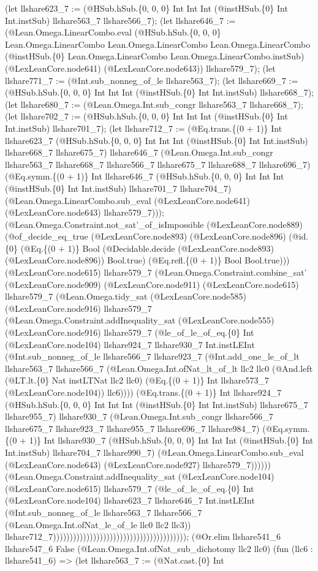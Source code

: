 \documentclass[11pt]{article}
\begin{document}
(let llshare623\_7 := (@HSub.hSub.\{0, 0, 0\} Int Int Int (@instHSub.\{0\} Int Int.instSub) llshare563\_7 llshare566\_7); (let llshare646\_7 := (@Lean.Omega.LinearCombo.eval (@HSub.hSub.\{0, 0, 0\} Lean.Omega.LinearCombo Lean.Omega.LinearCombo Lean.Omega.LinearCombo (@instHSub.\{0\} Lean.Omega.LinearCombo Lean.Omega.LinearCombo.instSub) (@LexLeanCore.node641) (@LexLeanCore.node643)) llshare579\_7); (let llshare771\_7 := (@Int.sub\_nonneg\_of\_le llshare563\_7); (let llshare669\_7 := (@HSub.hSub.\{0, 0, 0\} Int Int Int (@instHSub.\{0\} Int Int.instSub) llshare668\_7); (let llshare680\_7 := (@Lean.Omega.Int.sub\_congr llshare563\_7 llshare668\_7); (let llshare702\_7 := (@HSub.hSub.\{0, 0, 0\} Int Int Int (@instHSub.\{0\} Int Int.instSub) llshare701\_7); (let llshare712\_7 := (@Eq.trans.\{(0 + 1)\} Int llshare623\_7 (@HSub.hSub.\{0, 0, 0\} Int Int Int (@instHSub.\{0\} Int Int.instSub) llshare668\_7 llshare675\_7) llshare646\_7 (@Lean.Omega.Int.sub\_congr llshare563\_7 llshare668\_7 llshare566\_7 llshare675\_7 llshare688\_7 llshare696\_7) (@Eq.symm.\{(0 + 1)\} Int llshare646\_7 (@HSub.hSub.\{0, 0, 0\} Int Int Int (@instHSub.\{0\} Int Int.instSub) llshare701\_7 llshare704\_7) (@Lean.Omega.LinearCombo.sub\_eval (@LexLeanCore.node641) (@LexLeanCore.node643) llshare579\_7))); (@Lean.Omega.Constraint.not\_sat'\_of\_isImpossible (@LexLeanCore.node889) (@of\_decide\_eq\_true (@LexLeanCore.node893) (@LexLeanCore.node896) (@id.\{0\} (@Eq.\{(0 + 1)\} Bool (@Decidable.decide (@LexLeanCore.node893) (@LexLeanCore.node896)) Bool.true) (@Eq.refl.\{(0 + 1)\} Bool Bool.true))) (@LexLeanCore.node615) llshare579\_7 (@Lean.Omega.Constraint.combine\_sat' (@LexLeanCore.node909) (@LexLeanCore.node911) (@LexLeanCore.node615) llshare579\_7 (@Lean.Omega.tidy\_sat (@LexLeanCore.node585) (@LexLeanCore.node916) llshare579\_7 (@Lean.Omega.Constraint.addInequality\_sat (@LexLeanCore.node555) (@LexLeanCore.node916) llshare579\_7 (@le\_of\_le\_of\_eq.\{0\} Int (@LexLeanCore.node104) llshare924\_7 llshare930\_7 Int.instLEInt (@Int.sub\_nonneg\_of\_le llshare566\_7 llshare923\_7 (@Int.add\_one\_le\_of\_lt llshare563\_7 llshare566\_7 (@Lean.Omega.Int.ofNat\_lt\_of\_lt llc2 llc0 (@And.left (@LT.lt.\{0\} Nat instLTNat llc2 llc0) (@Eq.\{(0 + 1)\} Int llshare573\_7 (@LexLeanCore.node104)) llc6)))) (@Eq.trans.\{(0 + 1)\} Int llshare924\_7 (@HSub.hSub.\{0, 0, 0\} Int Int Int (@instHSub.\{0\} Int Int.instSub) llshare675\_7 llshare955\_7) llshare930\_7 (@Lean.Omega.Int.sub\_congr llshare566\_7 llshare675\_7 llshare923\_7 llshare955\_7 llshare696\_7 llshare984\_7) (@Eq.symm.\{(0 + 1)\} Int llshare930\_7 (@HSub.hSub.\{0, 0, 0\} Int Int Int (@instHSub.\{0\} Int Int.instSub) llshare704\_7 llshare990\_7) (@Lean.Omega.LinearCombo.sub\_eval (@LexLeanCore.node643) (@LexLeanCore.node927) llshare579\_7)))))) (@Lean.Omega.Constraint.addInequality\_sat (@LexLeanCore.node104) (@LexLeanCore.node615) llshare579\_7 (@le\_of\_le\_of\_eq.\{0\} Int (@LexLeanCore.node104) llshare623\_7 llshare646\_7 Int.instLEInt (@Int.sub\_nonneg\_of\_le llshare563\_7 llshare566\_7 (@Lean.Omega.Int.ofNat\_le\_of\_le llc0 llc2 llc3)) llshare712\_7)))))))))))))))))))))))))))))))))))))))); (@Or.elim llshare541\_6 llshare547\_6 False (@Lean.Omega.Int.ofNat\_sub\_dichotomy llc2 llc0) (fun (llc6 : llshare541\_6) => (let llshare563\_7 := (@Nat.cast.\{0\} Int 
\end{document}
